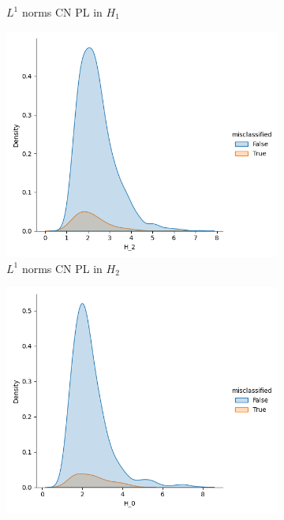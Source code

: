 \documentclass{article}
\begin{document}
\begin{figure}[htb]
\begin{subfigure}{0.32\textwidth}
    \caption{$L^1$ norms CN PL in $H_1$}
  \end{subfigure}
  \begin{subfigure}{0.32\textwidth}
    \includegraphics[width=\textwidth]{figures/misclassification_distance/distribution_distance_misclassified_CN_H_2.png}
    \caption{$L^1$ norms CN PL in $H_2$}
  \end{subfigure}
  \begin{subfigure}{0.32\textwidth}
    \includegraphics[width=\textwidth]{figures/misclassification_distance/distribution_distance_misclassified_AD_H_0.png}

\end{subfigure}
\end{figure}
\end{document}
